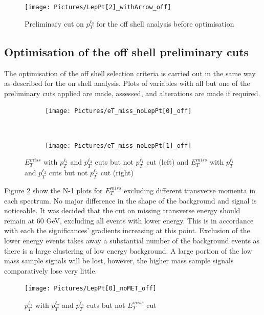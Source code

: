 \begin{figure}[H] %
   \centering
   \texttt{[image: Pictures/LepPt[2]\_withArrow\_off]} 
   \caption{Preliminary cut on $p_{T}^{\ell_{3}}$ for the off shell analysis before optimisation}
   \label{fig:example}
\end{figure}

\subsection{Optimisation of the off shell preliminary cuts}
The optimisation of the off shell selection criteria is carried out in the same way as described for the on shell analysis.
Plots of variables with all but one of the preliminary cuts applied are made, assessed, and alterations are made if required.


\begin{figure}[H]
    \centering
    \begin{subfigure}[b]{0.48\textwidth}
        \centering
        \texttt{[image: Pictures/eT\_miss\_noLepPt[0]\_off]}
    \caption{}
    \end{subfigure}
    ~
    \begin{subfigure}[b]{0.48\textwidth}
        \centering
        \texttt{[image: Pictures/eT\_miss\_noLepPt[1]\_off]}
    \caption{}    
        \end{subfigure}
\caption{$E_{T}^{miss}$ with $p_{T}^{\ell_{2}}$ and $p_{T}^{\ell_{3}}$ cuts but not $p_{T}^{\ell_{1}}$ cut (left) and $E_{T}^{miss}$ with $p_{T}^{\ell_{1}}$ and $p_{T}^{\ell_{2}}$ cuts but not $p_{T}^{\ell_{2}}$ cut (right)}
\label{fig:METN-1OFF}
\end{figure}

Figure \ref{fig:METN-1OFF} show the N-1 plots for $E_{T}^{miss}$ excluding different transverse momenta in each spectrum.
No major difference in the shape of the background and signal is noticeable.
It was decided that the cut on missing transverse energy should remain at 60 GeV, excluding all events with lower energy.
This is in accordance with each the significances' gradients increasing at this point.  
Exclusion of the lower energy events takes away a substantial number of the background events as there is a large clustering of low energy background.
A large portion of the low mass sample signals will be lost, however, the higher mass sample signals comparatively lose very little. 

\begin{figure}[H] %
   \centering
   \texttt{[image: Pictures/LepPt[0]\_noMET\_off]} 
   \caption{$p_{T}^{\ell_{1}}$ with $p_{T}^{\ell_{2}}$ and $p_{T}^{\ell_{3}}$ cuts but not $E_{T}^{miss}$ cut}
   \label{fig:LepPt[0]N-1MET}
\end{figure}

